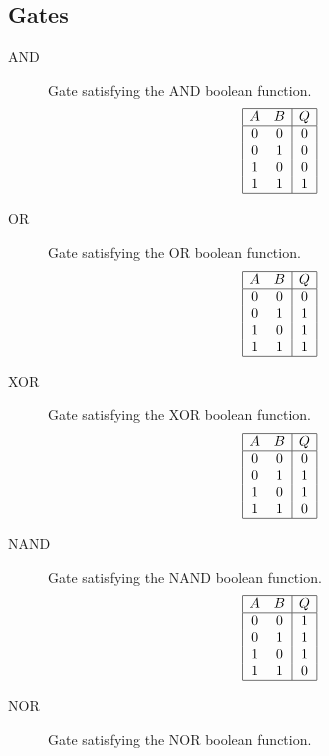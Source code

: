 \documentclass[12pt, a4paper]{article}
\begin{document}
\subsection{Gates}
\begin{description}
  \item[AND]
    Gate satisfying the AND boolean function.
    $$
    \begin{array}{|cc|c|}
    \hline
    A & B & Q \\
    \hline
    0 & 0 & 0 \\
    0 & 1 & 0 \\
    1 & 0 & 0 \\
    1 & 1 & 1 \\
    \hline
    \end{array}
    $$
  \item[OR]
    Gate satisfying the OR boolean function.
    $$
    \begin{array}{|cc|c|}
    \hline
    A & B & Q \\
    \hline
    0 & 0 & 0 \\
    0 & 1 & 1 \\
    1 & 0 & 1 \\
    1 & 1 & 1 \\
    \hline
    \end{array}
    $$
  \item[XOR]
    Gate satisfying the XOR boolean function.
    $$
    \begin{array}{|cc|c|}
    \hline
    A & B & Q \\
    \hline
    0 & 0 & 0 \\
    0 & 1 & 1 \\
    1 & 0 & 1 \\
    1 & 1 & 0 \\
    \hline
    \end{array}
    $$
  \item[NAND]
    Gate satisfying the NAND boolean function.
    $$
    \begin{array}{|cc|c|}
    \hline
    A & B & Q \\
    \hline
    0 & 0 & 1 \\
    0 & 1 & 1 \\
    1 & 0 & 1 \\
    1 & 1 & 0 \\
    \hline
    \end{array}
    $$
  \item[NOR]
    Gate satisfying the NOR boolean function.
    $$
    \begin{array}{|cc|c|}

\end{array}$$
\end{description}
\end{document}
